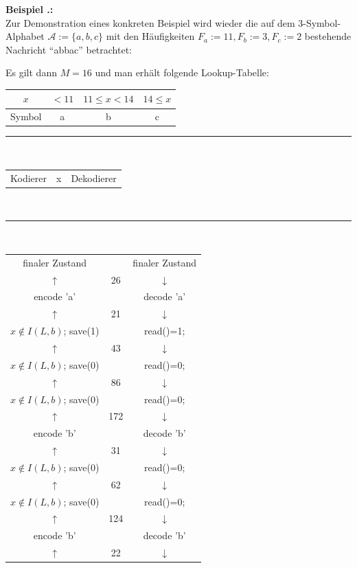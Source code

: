 \documentclass[a4paper,12pt]{article}
\newcommand{\A}{\mathcal A}
\newcounter{Beispiel}
\newenvironment{Beispiel}{
\medskip
        
        \setlength{\parindent}{0pt}
        \addtocounter{Beispiel}{1}
        \textbf{\textsf{Beispiel \thesubsection.\theBeispiel}:}\\}{
        \nopagebreak
        \vspace{-1.0ex}
        \bigskip
        
}
\begin{document}
\begin{Beispiel}
Zur Demonstration eines konkreten Beispiel wird wieder die auf dem  3-Symbol-Alphabet $\A:=\{a, b, c\}$ mit den Häufigkeiten $F_{a}:=11, F_{b}:=3,  F_{c}:=2$ bestehende Nachricht "`abbac"' betrachtet:
\par
\vspace{0.5cm}
Es gilt dann $M=16$ und man erhält folgende Lookup-Tabelle:
\begin{center}
\begin{tabular}{c|c|c|c}
$x$ & $<11$ & $11 \leq x <14$ & $14\leq x$
\\
\hline
Symbol & a & b & c
\end{tabular}
\end{center}
\begin{center}
{\color{gray!50!blue}\rule{8cm}{0.5mm}}
\\
\begin{tabular}{c c c}
Kodierer & x & Dekodierer
\end{tabular}
\vspace{-0.2cm}
\\
{\color{gray!50!blue}\rule{8cm}{0.1mm}}
\\
\begin{tabular}{c c c}
finaler Zustand & & finaler Zustand
\\
$\uparrow$ & 26 & $\downarrow$
\\
encode 'a' & & decode 'a'
\\
$\uparrow$ & 21 & $\downarrow$
\\
$x \not\in I(L,b)$; save(1) &  & read()=1;
\\
$\uparrow$ & 43 & $\downarrow$
\\
$x \not\in I(L,b)$; save(0) &  & read()=0;
\\
$\uparrow$ & 86 & $\downarrow$
\\
$x \not\in I(L,b)$; save(0) &  & read()=0;
\\
$\uparrow$ & 172 & $\downarrow$
\\
encode 'b' & & decode 'b'
\\
$\uparrow$ & 31 & $\downarrow$
\\
$x \not\in I(L,b)$; save(0) &  & read()=0;
\\
$\uparrow$ & 62 & $\downarrow$
\\
$x \not\in I(L,b)$; save(0) &  & read()=0;
\\
$\uparrow$ & 124 & $\downarrow$
\\
encode 'b' & & decode 'b'
\\
$\uparrow$ & 22 & $\downarrow$

\end{tabular}
\end{center}
\end{Beispiel}
\end{document}

